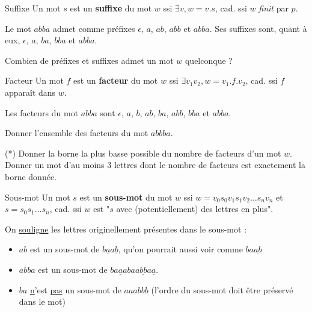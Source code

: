 \begin{definition}{Suffixe}{}
Un mot $s$ est un \textbf{suffixe} du mot $w$ ssi $\exists v, w = v.s$, cad. ssi $w$ \textit{finit} par $p$.
\end{definition}

\begin{example}
Le mot $abba$ admet comme préfixes $\epsilon$, $a$, $ab$, $abb$ et $abba$. Ses suffixes sont, quant à eux, $\epsilon$, $a$, $ba$, $bba$ et $abba$.
\end{example}

\begin{exercice}\label{expref}
Combien de préfixes et suffixes admet un mot $w$ quelconque ?
\end{exercice}

\begin{definition}{Facteur}{}
Un mot $f$ est un \textbf{facteur} du mot $w$ ssi $\exists v_1 v_2, w = v_1.f.v_2$, cad. ssi $f$ apparaît dans $w$.
\end{definition}

\begin{example}
Les facteurs du mot $abba$ sont $\epsilon$, $a$, $b$, $ab$, $ba$, $abb$, $bba$ et $abba$. 
\end{example}


\begin{exercice}
Donner l'ensemble des facteurs du mot $abbba$.
\end{exercice}

\begin{exercice} \label{exfact}(*)
Donner la borne la plus basse possible du nombre de facteurs d'un mot $w$. Donner un mot d'au moins 3 lettres dont le nombre de facteurs est exactement la borne donnée.
\end{exercice}

\begin{definition}{Sous-mot}{}
Un mot $s$ est un \textbf{sous-mot} du mot $w$ ssi $w = v_0s_0v_1s_1v_2...s_nv_n$ et $s = s_0s_1...s_n$, cad. ssi $w$ est "$s$ avec (potentiellement) des lettres en plus".
\end{definition}

\begin{example}\label{ex5} On \underline{souligne} les lettres originellement présentes dans le sous-mot :
\begin{itemize}
   \item $ab$ est un sous-mot de $b\underline{a}a\underline{b}$, qu'on pourrait aussi voir comme $ba\underline{ab}$
   \item $abba$ est un sous-mot de $ba\underline{a}abaa\underline{bb}a\underline{a}$.
   \item $ba$ \underline{n}'est \underline{pas} un sous-mot de $aaabbb$ (l'ordre du sous-mot doit être préservé dans le mot) 
\end{itemize}
\end{example}


